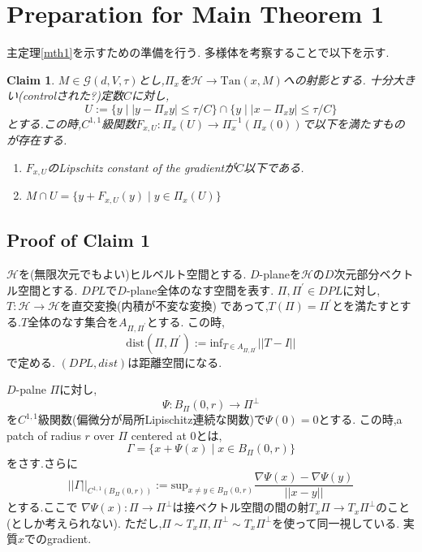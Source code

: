 \documentclass{ujarticle}
\newtheorem{clm}{Claim}
\newcommand{\bpd}{B_{\Pi}(0,r)}
\newcommand{\gnd}{||\Gamma||_{C^{1,1}(\bpd)}}
\newcommand{\gdvt}{\mathcal{G}(d,V,\tau)}
\begin{document}
\section{Preparation for Main Theorem 1}
\label{Preparation for Main Theorem 1}
主定理\ref{mth1}を示すための準備を行う.
多様体を考察することで以下を示す.
\begin{clm}
  $M \in \gdvt$とし,$\Pi_x$を$\mathcal{H} \to \mathrm{Tan}(x,M)$への射影とする.
  十分大きい(controlされた?)定数$C$に対し,
  \begin{equation*}
   U:= \{ y \mid |y - \Pi_xy| \le \tau/C \} \cap \{ y \mid |x - \Pi_x y| \le \tau/C \}
  \end{equation*}
  とする.この時,$C^{1,1}$級関数$F_{x,U}:\Pi_x(U) \to \Pi_x^{-1}(\Pi_x(0))$で以下を満たすものが存在する.
  \begin{enumerate}
    \item $F_{x,U}$のLipschitz constant of the gradientが$C$以下である.
    \item $ \displaystyle
    M \cap U = \{ y + F_{x,U}(y) \mid y \in \Pi_x(U) \} $
  \end{enumerate}
\end{clm}

\subsection{Proof of Claim 1}
\label{sec:Proof of CLAIM 1}

$\mathcal{H}$を(無限次元でもよい)ヒルベルト空間とする.
$D$-planeを$\mathcal{H}$の$D$次元部分ベクトル空間とする.
$DPL$で$D$-plane全体のなす空間を表す.
$\Pi,\Pi^\prime \in DPL$に対し,$T: \mathcal{H} \to \mathcal{H}$を直交変換(内積が不変な変換)
であって,$T(\Pi)= \Pi^\prime$とを満たすとする.$T$全体のなす集合を$A_{\Pi,\Pi^\prime}$とする.
この時,
\begin{equation*}
 \mathrm{dist} (\Pi,\Pi^\prime):= \mathrm{inf}_{T \in A_{\Pi,\Pi^\prime}} ||T -I||
\end{equation*}
で定める.
$(DPL,dist)$は距離空間になる.

$D$-palne $\Pi$に対し,
\begin{equation*}
 \Psi :\bpd \to \Pi^{\perp}
\end{equation*}
を$C^{1,1}$級関数(偏微分が局所Lipischitz連続な関数)で$\Psi(0)=0$とする.
この時,a patch of radius $r$ over $\Pi$ centered at 0とは,
\begin{equation*}
 \Gamma=\{ x + \Psi(x) \mid x \in \bpd \}
\end{equation*}
をさす.さらに
\begin{equation*}
 \gnd := \mathrm{sup}_{x \neq y \in \bpd} \frac{ \nabla \Psi(x) - \nabla \Psi(y)}{||x - y||}
\end{equation*}
とする.ここで
$\nabla\Psi(x):\Pi \to \Pi^{\perp}$は接ベクトル空間の間の射$T_x\Pi \to T_x\Pi^{\perp}$のこと(としか考えられない).
ただし,$\Pi \sim T_x \Pi, \Pi^{\perp} \sim T_x\Pi^{\perp}$を使って同一視している.
実質$x$でのgradient.
\end{document}
